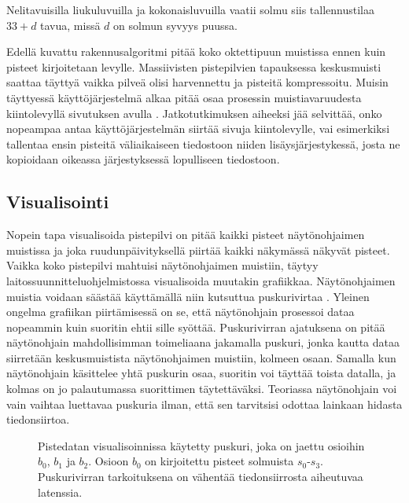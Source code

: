\noindent Nelitavuisilla liukuluvuilla ja kokonaisluvuilla vaatii solmu siis tallennustilaa $33 + d$ tavua, missä $d$ on solmun syvyys puussa.

Edellä kuvattu rakennusalgoritmi pitää koko oktettipuun muistissa ennen kuin pisteet kirjoitetaan levylle. Massiivisten pistepilvien tapauksessa keskusmuisti saattaa täyttyä vaikka pilveä olisi harvennettu ja pisteitä kompressoitu. Muisin täyttyessä käyttöjärjestelmä alkaa pitää osaa prosessin muistiavaruudesta kiintolevyllä sivutuksen  avulla \cite{os}. Jatkotutkimuksen aiheeksi jää selvittää, onko nopeampaa antaa käyttöjärjestelmän siirtää sivuja kiintolevylle, vai esimerkiksi tallentaa ensin pisteitä väliaikaiseen tiedostoon niiden lisäysjärjestykessä, josta ne kopioidaan oikeassa järjestyksessä lopulliseen tiedostoon. 

\subsection{Visualisointi}\label{render}

Nopein tapa visualisoida pistepilvi on pitää kaikki pisteet näytönohjaimen muistissa ja joka ruudunpäivityksellä piirtää kaikki näkymässä näkyvät pisteet. Vaikka koko pistepilvi mahtuisi näytönohjaimen muistiin, täytyy laitossuunnitteluohjelmistossa visualisoida muutakin grafiikkaa. Näytönohjaimen muistia voidaan säästää käyttämällä niin kutsuttua puskurivirtaa . Yleinen ongelma grafiikan piirtämisessä on se, että näytönohjain prosessoi dataa nopeammin kuin suoritin ehtii sille syöttää. Puskurivirran ajatuksena on pitää näytönohjain mahdollisimman toimeliaana jakamalla puskuri, jonka kautta dataa siirretään keskusmuistista näytönohjaimen muistiin, kolmeen osaan. Samalla kun näytönohjain käsittelee yhtä puskurin osaa, suoritin voi täyttää toista datalla, ja kolmas on jo palautumassa suorittimen täytettäväksi. Teoriassa näytönohjain voi vain vaihtaa luettavaa puskuria ilman, että sen tarvitsisi odottaa lainkaan hidasta tiedonsiirtoa. \cite{opengl}

\begin{figure}
    \centering
    
    \caption{Pistedatan visualisoinnissa käytetty puskuri, joka on jaettu osioihin $b_0$, $b_1$ ja $b_2$. Osioon $b_0$ on kirjoitettu pisteet solmuista $s_0$-$s_3$. Puskurivirran tarkoituksena on vähentää tiedonsiirrosta aiheutuvaa latenssia.}
    \label{triplebuffering}
\end{figure}

